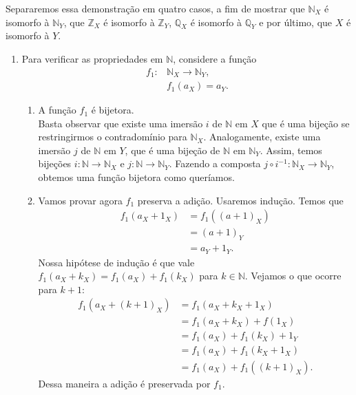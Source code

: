 \documentclass[../main.tex]{subfiles}
\begin{document}
\begin{dem}
    Separaremos essa demonstração em quatro casos, a fim de mostrar que $\mathbb{N}_X$ é isomorfo à $\mathbb{N}_Y$, que $\mathbb{Z}_X$ é isomorfo à $\mathbb{Z}_Y$, $\mathbb{Q}_X$ é isomorfo à $\mathbb{Q}_Y$ e por último, que $X$ é isomorfo à $Y$.
    
\begin{enumerate}
    \item Para verificar as propriedades em $\mathbb{N}$, considere a função
                \begin{align*}
                    f_1 \colon &\mathbb{N}_X \to \mathbb{N}_Y, \\
                    & f_1(a_X) = a_Y.
                \end{align*}
                
        \begin{enumerate}
            \item A função $f_1$ é bijetora. \\
            Basta observar que existe uma imersão $i$ de $\mathbb{N}$ em $X$ que é uma bijeção se restringirmos o contradomínio para $\mathbb{N}_X$. Analogamente, existe uma imersão $j$ de $\mathbb{N}$ em $Y$, que é uma bijeção de $\mathbb{N}$ em $\mathbb{N}_Y$. Assim, temos bijeções $i \colon \mathbb{N} \to \mathbb{N}_X$ e $j \colon \mathbb{N} \to \mathbb{N}_Y$. Fazendo a composta $ j \circ i^{-1} \colon \mathbb{N}_X \to \mathbb{N}_Y$, obtemos uma função bijetora como queríamos. \\
                
            
            \item Vamos provar agora $f_1$ preserva a adição. Usaremos indução. 
                Temos que
                \begin{align*}
                    f_1(a_X+1_X) 
                    &= f_1((a+1)_X) \\
                    &= (a+1)_Y \\
                    &= a_Y + 1_Y.
                \end{align*}
                Nossa hipótese de indução é que vale $f_1(a_X + k_X) = f_1(a_X) + f_1(k_X)$ para $k \in \mathbb{N}$. Vejamos o que ocorre para $k+1$: 
                \begin{align*}
                    f_1(a_X + (k+1)_X) 
                    &= f_1(a_X + k_X + 1_X) \\
                    &= f_1(a_X + k_X) + f(1_X)  \\
                    &= f_1(a_X) + f_1(k_X) + 1_Y \\
                    &= f_1(a_X) + f_1(k_X + 1_X) \\
                    &= f_1(a_X) + f_1((k+1)_X).     
                \end{align*}        
                Dessa maneira a adição é preservada por $f_1$.


\end{enumerate}
\end{enumerate}
\end{dem}
\end{document}
